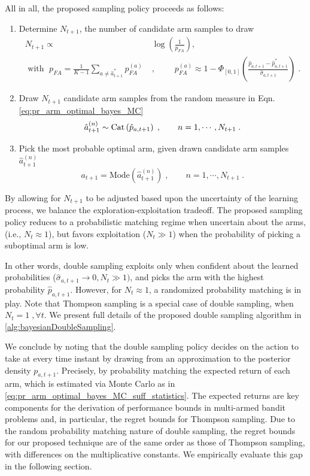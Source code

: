 \documentclass[10pt]{article}
\newcommand{\ie}{i.e., }
\newcommand{\Cat}{{\rm Cat}}
\begin{document}
All in all, the proposed sampling policy proceeds as follows:
\begin{enumerate}
	\item Determine $N_{t+1}$, the number of candidate arm samples to draw
		\begin{equation}
		\begin{split}
		N_{t+1} \propto & \log\left(\frac{1}{p_{FA}}\right), \\
		\text{ with } \; p_{FA}=\frac{1}{K-1}\sum_{a \neq \hat{a}_{t+1}^*}p_{FA}^{(a)}\; &, \qquad \; p_{FA}^{(a)} \approx 1- \Phi_{[0,1]}\left(\frac{\hat{p}_{a,t+1} - \hat{p}^*_{a,{t+1}}}{\hat{\sigma}_{a,t+1}}\right) \; .
		\end{split}
		\label{eq:policy_n_samples}
		\end{equation}
	\item Draw $N_{t+1}$ candidate arm samples from the random measure in Eqn. \ref{eq:pr_arm_optimal_bayes_MC}
	\begin{equation}
	\hat{a}_{t+1}^{(n)} \sim \Cat \left(\hat{p}_{a,t+1}\right) \; , \qquad n=1,\cdots, N_{t+1} \; .
	\end{equation}
	\item Pick the most probable optimal arm, given drawn candidate arm samples $\hat{a}_{t+1}^{(n)}$
	\begin{equation}
	a_{t+1} = \text{Mode}\left(\hat{a}_{t+1}^{(n)}\right) \; , \qquad  n=1,\cdots,N_{t+1} \;.
	\end{equation}
\end{enumerate}

By allowing for $N_{t+1}$ to be adjusted based upon the uncertainty of the learning process, we balance the exploration-exploitation tradeoff. The proposed sampling policy reduces to a probabilistic matching regime when uncertain about the arms, (\ie $N_t \approx 1$), but favors exploitation ($N_t \gg 1$) when the probability of picking a suboptimal arm is low.

In other words, double sampling exploits only when confident about the learned probabilities ($\hat{\sigma}_{a,t+1} \rightarrow 0, N_t \gg 1)$, and picks the arm with the highest probability $\hat{p}_{a,t+1}$. However, for $N_t \approx 1$, a randomized probability matching is in play. Note that Thompson sampling is a special case of double sampling, when $N_{t}=1 \;, \forall t$. We present full details of the proposed double sampling algorithm in \autoref{alg:bayesianDoubleSampling}.

We conclude by noting that the double sampling policy decides on the action to take at every time instant by drawing from an approximation to the posterior density $p_{a,t+1}$. Precisely, by probability matching the expected return of each arm, which is estimated via Monte Carlo as in \autoref{eq:pr_arm_optimal_bayes_MC_suff_statistics}. The expected returns are key components for the derivation of performance bounds in multi-armed bandit problems and, in particular, the regret bounds for Thompson sampling. Due to the random probability matching nature of double sampling, the regret bounds for our proposed technique are of the same order as those of Thompson sampling, with differences on the multiplicative constants. We empirically evaluate this gap in the following section.
\end{document}
